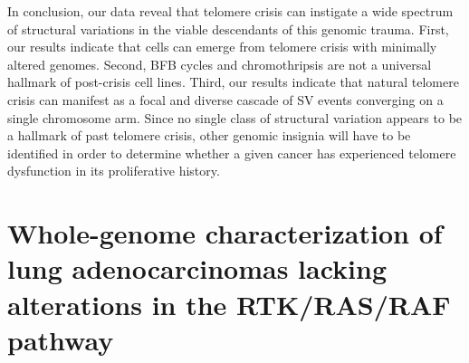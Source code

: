 \documentclass[phd,tocprelim]{cornell}
\begin{document}
In conclusion, our data reveal that telomere crisis can instigate a wide spectrum of structural variations in the viable descendants of this genomic trauma. First, our results indicate that cells can emerge from telomere crisis with minimally altered genomes. Second, BFB cycles and chromothripsis are not a universal hallmark of post-crisis cell lines. Third, our results indicate that natural telomere crisis can manifest as a focal and diverse cascade of SV events converging on a single chromosome arm. Since no single class of structural variation appears to be a hallmark of past telomere crisis, other genomic insignia will have to be identified in order to determine whether a given cancer has experienced telomere dysfunction in its proliferative history. 





\chapter{Whole-genome characterization of lung adenocarcinomas lacking alterations in the RTK/RAS/RAF pathway}
\end{document}
